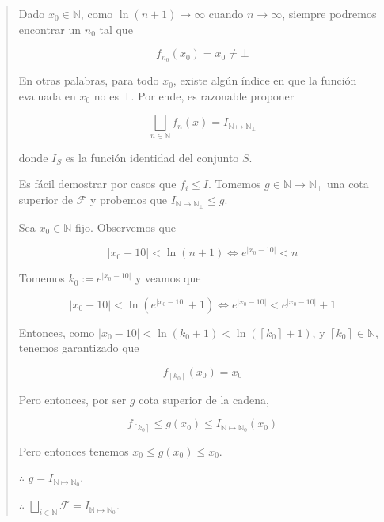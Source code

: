 \documentclass[a4paper, 12pt]{article}
\begin{document}
\small
\begin{quote}

  Dado $x_0 \in \mathbb{N}$, como $\ln(n+1) \to \infty$ cuando $n \to \infty$,
  siempre podremos encontrar un $n_0$ tal que 

  \begin{equation*}
    f_{n_0}(x_0) = x_0 \neq \bot 
  \end{equation*}

En otras palabras, para todo $x_0$, existe algún índice en que la función
evaluada en $x_0$ no es $\bot $. Por ende, es razonable proponer

\begin{equation*}
  \bigsqcup_{n \in \mathbb{N}} f_n(x) = I_{\mathbb{N} \mapsto \mathbb{N}_\bot }
\end{equation*}

donde $I_S$ es la función identidad del conjunto $S$.

Es fácil demostrar por casos que $f_i \leq I$. Tomemos $g \in \mathbb{N} \to
\mathbb{N}_\bot $ una cota superior de $\mathcal{F}$ y probemos que
$I_{\mathbb{N} \to \mathbb{N}_\bot } \leq g$.

Sea $x_0 \in \mathbb{N}$ fijo. Observemos que


\begin{equation*}
  \left| x_0 - 10 \right| < \ln(n+1) \iff e^{\left| x_0 - 10 \right| } < n
\end{equation*}

Tomemos $k_0 := e^{\left| x_0 - 10 \right| }
$ y veamos que

\begin{equation*}
  \left| x_0 - 10 \right|  < \ln\left( e^{\left| x_0 - 10 \right|  } + 1
  \right) \iff e^{\left| x_0 - 10 \right| } < e^{\left| x_0 - 10 \right| } + 1
\end{equation*}

Entonces, como $\left| x_0 - 10 \right| < \ln(k_0 + 1) <
\ln(\left\lceil k_0 \right\rceil + 1) $, y $\left\lceil k_0 \right\rceil \in
\mathbb{N}$, tenemos garantizado que 

\begin{equation*}
  f_{\left\lceil k_0 \right\rceil }(x_0) = x_0
\end{equation*}

Pero entonces, por ser $g$ cota superior de la cadena, 

$$f_{\left\lceil k_0 \right\rceil } \leq g(x_0) \leq I_{\mathbb{N}\mapsto \mathbb{N}_0}(x_0)$$ 

Pero entonces tenemos $x_0 \leq g(x_0) \leq x_0$.

$\therefore $ $g = I_{\mathbb{N} \mapsto \mathbb{N}_0}$.

$\therefore $ $\bigsqcup_{i \in \mathbb{N}} \mathcal{F} = I_{\mathbb{N}
\mapsto \mathbb{N}_0}$.

\end{quote}
\normalsize
\end{document}
